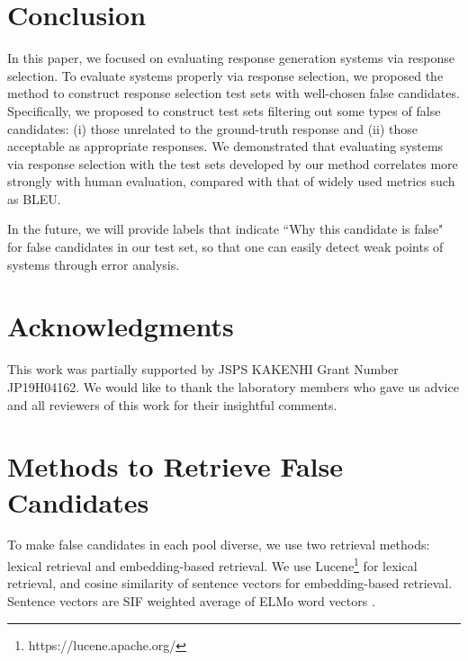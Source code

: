\documentclass[11pt,a4paper]{article}
\begin{document}
%

\section{Conclusion}
%
In this paper, we focused on evaluating response generation systems via response selection.
To evaluate systems properly via response selection, we proposed the method to construct response selection test sets with well-chosen false candidates.
Specifically, we proposed to construct test sets filtering out some types of false candidates: (i) those unrelated to the ground-truth response and (ii) those acceptable as appropriate responses.
We demonstrated that evaluating systems via response selection with the test sets developed by our method correlates more strongly with human evaluation, compared with that of widely used metrics such as BLEU.

In the future, we will provide labels that indicate ``Why this candidate is false" for false candidates in our test set, so that one can easily detect weak points of systems through error analysis.

\section*{Acknowledgments}
This work was partially supported by JSPS KAKENHI Grant Number JP19H04162.
We would like to thank the laboratory members who gave us advice and all reviewers of this work for their insightful comments.

\clearpage

%










%

\clearpage
%
\appendix




%
\section{Methods to Retrieve False Candidates}
\label{sec:constructionsettings}
To make false candidates in each pool diverse, we use two retrieval methods: lexical retrieval and embedding-based retrieval.
We use Lucene\footnote{https://lucene.apache.org/} for lexical retrieval, and cosine similarity of sentence vectors for embedding-based retrieval.
Sentence vectors are SIF \cite{Arora2017} weighted average of ELMo word vectors \cite{peters-etal-2018-deep}.
\end{document}
